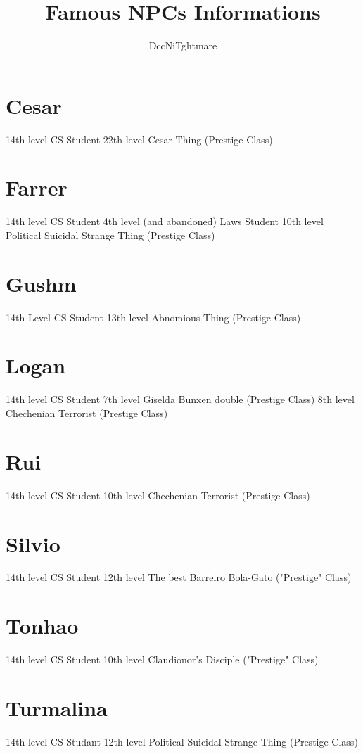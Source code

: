 \documentclass[ letterpaper,12pt]{article}
\begin{document}
\title{\textbf{Famous NPCs Informations}}

\author{
DccNiTghtmare
}

\maketitle
{}



\newpage

\tableofcontents

\newpage

\section{Cesar}
14th level CS Student
22th level Cesar Thing (Prestige Class)
\section{Farrer}
14th level CS Student
4th level (and abandoned) Laws Student
10th level Political Suicidal Strange Thing (Prestige Class)
\section{Gushm}
14th Level CS Student
13th level Abnomious Thing (Prestige Class)
\section{Logan}
14th level CS Student
7th level Giselda Bunxen double (Prestige Class)
8th level Chechenian Terrorist (Prestige Class)
\section{Rui}
14th level CS Student
10th level Chechenian Terrorist (Prestige Class)
\section{Silvio}
14th level CS Student
12th level The best Barreiro Bola-Gato ("Prestige" Class)
\section{Tonhao}
14th level CS Student
10th level Claudionor's Disciple ("Prestige" Class)
\section{Turmalina}
14th level CS Studant
12th level Political Suicidal Strange Thing (Prestige Class)
\end{document}
